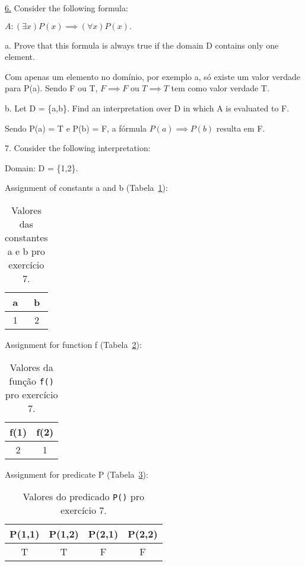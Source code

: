 \underline{6.} Consider the following formula:

$ A: (\exists x) P(x) \implies (\forall x) P(x). $

a. Prove that this formula is always true if the domain D contains only one element.

Com apenas um elemento no domínio, por exemplo a, só existe um valor verdade para P(a). Sendo F ou T, $ F \implies F $ ou $ T \implies T $ tem como valor verdade T.

b. Let D = \{a,b\}. Find an interpretation over D in which A is evaluated to F.

Sendo P(a) = T e P(b) = F, a fórmula $ P(a) \implies P(b) $ resulta em F.

7. Consider the following interpretation:

Domain: D = \{1,2\}.

Assignment of constants a and b (Tabela~\ref{tab:pergunta7a}):

\begin{table}[h]
 \centering
 \begin{tabular}{cc}
  \hline
  a & b \\ \hline
  1 & 2 \\ \hline
 \end{tabular}
 \caption{Valores das constantes a e b pro exercício 7.}
 \label{tab:pergunta7a}
\end{table}

Assignment for function f (Tabela~\ref{tab:pergunta7b}):

\begin{table}[h]
 \centering
 \begin{tabular}{cc}
  \hline
  f(1) & f(2) \\ \hline
  2 & 1 \\ \hline
 \end{tabular}
 \caption{Valores da função \texttt{f()} pro exercício 7.}
 \label{tab:pergunta7b}
\end{table}

Assignment for predicate P (Tabela~\ref{tab:pergunta7c}):

\begin{table}[h]
 \centering
 \begin{tabular}{cccc}
  \hline
  P(1,1) & P(1,2) & P(2,1) & P(2,2) \\ \hline
  T & T & F & F \\ \hline
 \end{tabular}
 \caption{Valores do predicado \texttt{P()} pro exercício 7.}
 \label{tab:pergunta7c}
\end{table}

